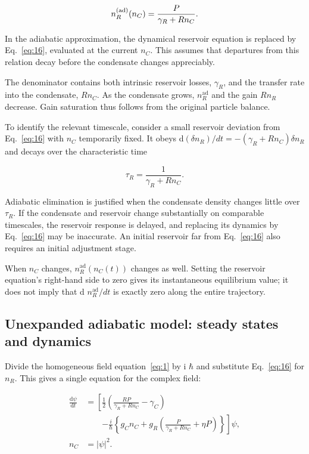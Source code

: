 \documentclass[12pt,a4paper]{article}
\begin{document}
\begin{equation}\label{eq:16}
n_R^{(\rm ad)}(n_C)=\frac{P}{\gamma_R+Rn_C}.\end{equation}

In the adiabatic approximation, the dynamical reservoir equation is replaced by Eq.~\eqref{eq:16}, evaluated at the current $n_{C}$. This assumes that departures from this relation decay before the condensate changes appreciably.

The denominator contains both intrinsic reservoir losses, $\gamma_{R}$, and the transfer rate into the condensate, $R n_{C}$. As the condensate grows, $n_{R}^{\mathrm{ad}}$ and the gain $R n_{R}$ decrease. Gain saturation thus follows from the original particle balance.

To identify the relevant timescale, consider a small reservoir deviation from Eq.~\eqref{eq:16} with $n_{C}$ temporarily fixed. It obeys d$(\delta n_{R})/dt=-(\gamma_{R}+R n_{C})\delta n_{R}$ and decays over the characteristic time

\[
\tau_R=\frac{1}{\gamma_R+Rn_C}.
\]

Adiabatic elimination is justified when the condensate density changes little over $\tau_{R}$. If the condensate and reservoir change substantially on comparable timescales, the reservoir response is delayed, and replacing its dynamics by Eq.~\eqref{eq:16} may be inaccurate. An initial reservoir far from Eq.~\eqref{eq:16} also requires an initial adjustment stage.

When $n_{C}$ changes, $n_{R}^{\mathrm{ad}}(n_{C}(t))$ changes as well. Setting the reservoir equation's right-hand side to zero gives its instantaneous equilibrium value; it does not imply that d $n_{R}^{\mathrm{ad}}/dt$ is exactly zero along the entire trajectory.

\subsection{Unexpanded adiabatic model: steady states and dynamics}\label{sec:4.2}

Divide the homogeneous field equation~\eqref{eq:1} by i $\hbar$ and substitute Eq.~\eqref{eq:16} for $n_{R}$. This gives a single equation for the complex field:

\begin{equation}\label{eq:17}
\begin{aligned}
\frac{\mathrm d\psi}{\mathrm dt}
&=\left[\frac12\left(\frac{RP}{\gamma_R+Rn_C}-\gamma_C\right)\right.\\
&\qquad\left.-\frac{i}{\hbar}\left\{g_Cn_C+
g_R\left(\frac{P}{\gamma_R+Rn_C}+\eta P\right)\right\}\right]\psi,\\
n_C&=|\psi|^2 .
\end{aligned}\end{equation}
\end{document}
